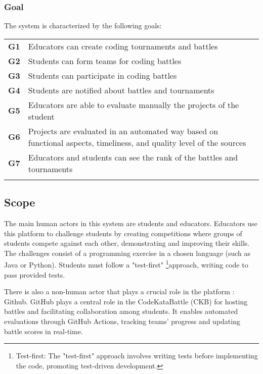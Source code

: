 \subsubsection{Goal}
The system is characterized by the following goals:
\begin{table}[H]
    \begin{tabularx}{\textwidth}{cX}
        \toprule
        \textbf{G1} & Educators can create coding tournaments and battles              \\
        \textbf{G2} & Students can form teams for coding battles  \\
        \textbf{G3} & Students can participate in coding battles    \\
        \textbf{G4} & Students are notified about battles and tournaments \\
        \textbf{G5} & Educators are able to evaluate manually the projects of the student\\
        \textbf{G6} & Projects are  evaluated in an automated way based on functional aspects, timeliness, and quality level of the sources  \\
        \textbf{G7} & Educators and students can see the rank of the battles and tournaments \\
        \\ \bottomrule
    \end{tabularx}
\end{table}


\subsection{Scope}
The main human actors in this system are students and educators. Educators use this platform to challenge students by creating competitions where groups of students compete against each other, demonstrating and improving their skills. The challenges consist of a programming exercise in a chosen language (such as Java or Python). Students must follow a "test-first" \footnote{Test-first: The "test-first" approach involves writing tests before implementing the code, promoting test-driven development.}approach, writing code to pass provided tests.

\noindent There is also a non-human actor that plays a crucial role in the platform : Github. GitHub plays a central role in the CodeKataBattle (CKB) for hosting battles and facilitating collaboration among students. It enables automated evaluations through GitHub Actions, tracking teams' progress and updating battle scores in real-time. 

